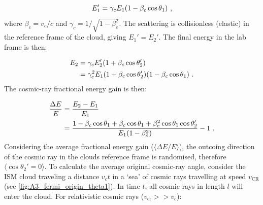 \begin{equation}
    \begin{aligned}
        E_1'=\gamma_cE_1\qty(1-\beta_c\cos\theta_1)\text{ ,}
    \end{aligned}
\end{equation}
\noindent where $\beta_c=v_c/c$ and $\gamma_c=1/\sqrt{1-\beta_c^2}$. The scattering is collisionless (elastic) in the reference frame of the cloud, giving $E_1'=E_2'$. The final energy in the lab frame is then:

\begin{equation}
    \begin{aligned}
        E_2&=\gamma_c E_2'\qty(1+\beta_c\cos\theta_2') \\
        &=\gamma_c^2E_1\qty(1+\beta_c\cos\theta_2')\qty(1-\beta_c\cos\theta_1) \text{ .}
    \end{aligned}
\end{equation}
\noindent The cosmic-ray fractional energy gain is then:

\begin{equation}
    \begin{aligned}
        \frac{\Delta E}{E}&=\frac{E_2-E_1}{E_1} \\
        &=\frac{1-\beta_c\cos\theta_1+\beta_c\cos\theta_1+\beta_c^2\cos\theta_1\cos\theta_2'}{E_1\qty(1-\beta_c^2)}-1\text{ .}
    \end{aligned}
\end{equation}
\noindent Considering the average fractional energy gain ($\langle \Delta E/E \rangle$), the outcoing direction of the cosmic ray in the clouds reference frame is randomised, therefore $\langle \cos\theta_2'=0 \rangle$. To calculate the average original cosmic-ray angle, consider the ISM cloud traveling a distance $v_ct$ in a `sea' of cosmic rays travelling at speed $v_\text{CR}$ (see \autoref{fig:A3_fermi_origin_theta1}). In time $t$, all cosmic rays in length $l$ will enter the cloud. For relativistic cosmic rays ($v_\text{cr}>>v_c$):


